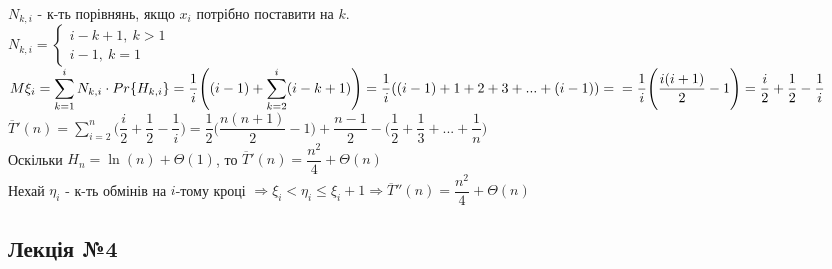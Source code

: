 \documentclass[a4paper,12pt]{article}
\newcommand{\dsum}{\displaystyle\sum}
\begin{document}
    $N_{k,i}$ - к-ть порівнянь, якщо $x_i$ потрібно поставити на $k$. \\
    $N_{k,i}=\begin{cases}
        i-k+1,\: k>1 \\
        i-1,\: k=1
    \end{cases}$ \\
    $M\xi_i=\dsum\limits_{k=1}^{i}N_{k,i}\cdot Pr\{H_{k,i}\}=\dfrac{1}{i}\Biggl((i-1)+\dsum\limits_{k=2}^{i}(i-k+1)\Biggr)=
    \dfrac{1}{i}((i-1)+1+2+3+...+(i-1))=\\=\dfrac{1}{i}\Biggl(\dfrac{i(i+1)}{2}-1\Biggr)=
    \dfrac{i}{2}+\dfrac{1}{2}-\dfrac{1}{i}$ \\
    $\overline{T}'(n)=\dsum\limits_{i=2}^{n}\Biggl(\dfrac{i}{2}+\dfrac{1}{2}-\dfrac{1}{i}\Biggr)=
    \dfrac{1}{2}\Biggl(\dfrac{n(n+1)}{2}-1\Biggr)+\dfrac{n-1}{2}-\Biggl(\dfrac{1}{2}+\dfrac{1}{3}+...+\dfrac{1}{n}\Biggr)$ \\
    Оскільки $H_n=\ln(n)+\Theta(1)$, то $\overline{T}'(n)=\dfrac{n^2}{4}+\Theta(n)$ \\
    Нехай $\eta_i$ - к-ть обмінів на $i$-тому кроці $\Rightarrow\xi_i<\eta_i\leqslant\xi_i+1 \Rightarrow \overline{T}''(n)=\dfrac{n^2}{4}+\Theta(n)$

\newpage
    \begin{center}
        \hrulefill
        \section{Лекція №4}
        \hrulefill
    \end{center}
\end{document}
